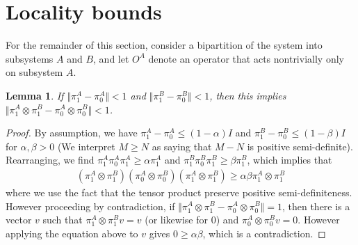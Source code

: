 \documentclass[11pt]{article}
\newtheorem{lem}{Lemma}
\begin{document}
\section{Locality bounds}
For the remainder of this section, consider a bipartition of the system into subsystems $A$ and $B$, and let $O^A$ denote an operator that acts nontrivially only on subsystem $A$.
\begin{lem}
    If $\Vert \pi^A_1 - \pi^A_0\Vert < 1$ and $\Vert \pi^B_1 - \pi^B_0 \Vert < 1$, then this implies $\Vert \pi^A_1 \otimes \pi^B_1 -\pi^A_0 \otimes \pi^B_0\Vert < 1$.
\end{lem}
\begin{proof}
   By assumption, we have $\pi^A_1 - \pi^A_0 \leq (1-\alpha)I$ and $\pi^B_1 - \pi^B_0 \leq (1-\beta)I$ for $\alpha, \beta > 0$ (We interpret $M \geq N$ as saying that $M-N$ is positive semi-definite). Rearranging, we find $\pi^A_1\pi^A_0 \pi^A_1 \geq \alpha \pi^A_1$ and $\pi^B_1 \pi^B_0 \pi^B_1 \geq \beta \pi^B_1$, which implies that
\begin{align}
    (\pi^A_1 \otimes \pi^B_1)(\pi^A_0 \otimes \pi^B_0)(\pi^A_1 \otimes \pi^B_1) \geq \alpha \beta \pi^A_1 \otimes \pi^B_1
\end{align}
where we use the fact that the tensor product preserve positive semi-definiteness. However proceeding by contradiction, if $\Vert \pi^A_1 \otimes \pi^B_1 -\pi^A_0 \otimes \pi^B_0\Vert = 1$, then there is a vector $v$ such that $\pi^A_1\otimes \pi^B_1 v =  v$ (or likewise for $0$) and $\pi^A_0 \otimes \pi^B_0v = 0$. However applying the equation above to $v$ gives $0 \geq \alpha \beta$, which is a contradiction.
\end{proof}
\end{document}
